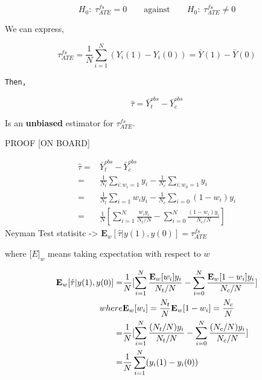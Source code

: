 \documentclass[
  letterpaper,
  DIV=11,
  numbers=noendperiod]{scrreprt}
\theoremstyle{definition}
\theoremstyle{remark}
\begin{document}
\par

\[
H_0:\;\tau^{fs}_{ATE} = 0 \qquad\text{against}\qquad H_0:\;\tau^{fs}_{ATE} \neq 0
\]

We can express,

\[
        \tau^{fs}_{ATE} = \frac{1}{N}\sum_{i=1}^{N}(Y_i(1)-Y_i(0))=\bar{Y}(1)-\bar{Y}(0)
\]

\begin{verbatim}
Then, 
\end{verbatim}

\[
        \hat{\tau} = \bar{Y}^{obs}_t-\bar{Y}^{obs}_c
\]

Is an \textbf{unbiased} estimator for \(\tau^{fs}_{ATE}\).

PROOF {[}ON BOARD{]}

\begin{tcolorbox}[enhanced jigsaw, bottomrule=.15mm, coltitle=black, arc=.35mm, left=2mm, opacityback=0, leftrule=.75mm, colbacktitle=quarto-callout-important-color!10!white, title={Proofs}, toprule=.15mm, bottomtitle=1mm, breakable, colframe=quarto-callout-important-color-frame, opacitybacktitle=0.6, titlerule=0mm, colback=white, rightrule=.15mm, toptitle=1mm]

\[
\begin{aligned}
\hat{\tau} = &\bar{Y}^{obs}_t-\bar{Y}^{obs}_c \\
=&\frac{1}{N_t}\sum_{i:w_i=1}y_i-\frac{1}{N_c}\sum_{i:w_0=1}y_i \\
=&\frac{1}{N_t}\sum_{i=1}w_iy_i-\frac{1}{N_c}\sum_{i=0}(1-w_i)y_i \\
=&\frac{1}{N}[\sum_{i=1}^{N}\frac{w_iy_i}{N_t/N}-\sum_{i=0}^{N}\frac{(1-w_i)y_i}{N_c/N}]
\end{aligned}
\] Neyman Test statisitc -\textgreater{}
\(\mathbf{E}_w[\hat{\tau}|y(1),y(0)]=\tau_{ATE}^{fs}\)

where \(\mathbf[E]_w\) means taking expectation with respect to \(w\)

\[
\begin{aligned}
\mathbf{E}_w[\hat{\tau}|y(1),y(0)] = &\frac{1}{N}[\sum_{i=1}^{N}\frac{\mathbf{E}_w[w_i]y_i}{N_t/N}-\sum_{i=0}^{N}\frac{\mathbf{E}_w[1-w_i]y_i}{N_c/N}] \\
 where &\space \mathbf{E}_w[w_i]=\frac{N_t}{N} \space\space\space\space\space \mathbf{E}_w[1-w_i]=\frac{N_c}{N} \\
=&\frac{1}{N}[\sum_{i=1}^{N}\frac{(N_t/N)y_i}{N_t/N}-\sum_{i=0}^{N}\frac{(N_c/N)y_i}{N_c/N}] \\
=&\frac{1}{N}\sum_{i=1}^{N}(y_i(1)-y_i(0))
\end{aligned}
\]

\end{tcolorbox}
\end{document}
